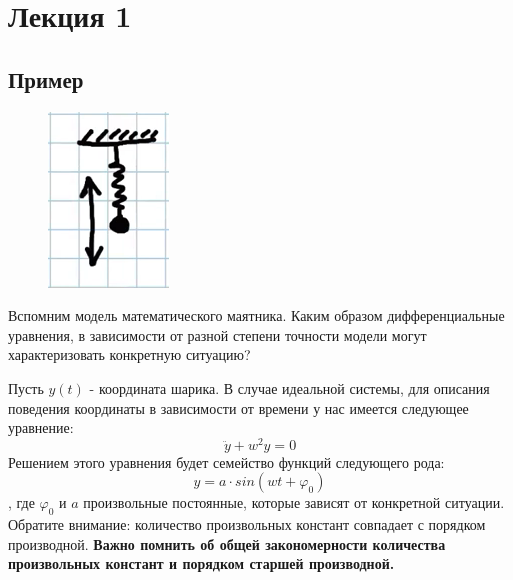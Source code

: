 \section{Лекция 1}
\subsection{Пример}

\begin{figure}
    \includegraphics[width=\linewidth]{images/pendulum.png}
\end{figure}
Вспомним модель математического маятника. Каким образом дифференциальные уравнения, в зависимости от разной степени точности модели могут характеризовать конкретную ситуацию?

Пусть $y(t)$ - координата шарика. В случае идеальной системы, для описания поведения координаты в зависимости от времени у нас имеется следующее уравнение:  $$\ddot{y} + w^2y = 0$$Решением этого уравнения будет семейство функций следующего рода: $$y=a\cdot sin(wt+\varphi_0)$$, где $\varphi_0$ и $a$ произвольные постоянные, которые зависят от конкретной ситуации. Обратите внимание: количество произвольных констант совпадает с порядком производной.
\textbf{Важно помнить об общей закономерности количества произвольных констант и порядком старшей производной.}

